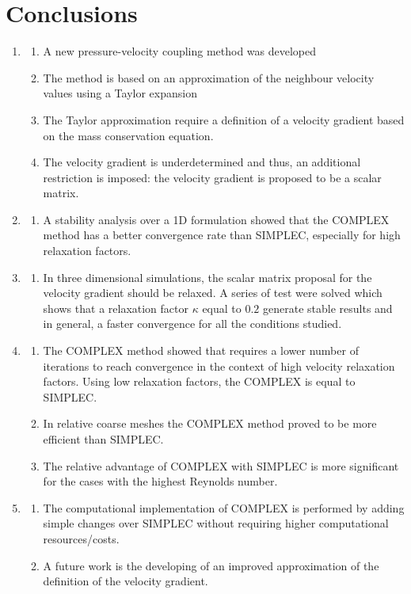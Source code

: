 \documentclass[final,3p,times,10pt,onecolumn]{myElsarticle}
\numberwithin{equation}{section}
\begin{document}
\section{Conclusions}
\label{sec:conclusions}

\begin{enumerate}

\item \begin{enumerate}
\item A new pressure-velocity coupling method was developed
\item The method is based on an approximation of the neighbour velocity values using a Taylor expansion
\item The Taylor approximation require a definition of a velocity gradient based on the mass conservation equation.
\item The velocity gradient is underdetermined and thus, an additional restriction is imposed: the velocity gradient is proposed to be a scalar matrix.
\end{enumerate} 
\item \begin{enumerate}
\item A stability analysis over a 1D formulation showed that the COMPLEX method has a better convergence rate than SIMPLEC, especially for high relaxation factors.
\end{enumerate}
\item \begin{enumerate}
\item In three dimensional simulations, the scalar matrix proposal for the velocity gradient should be relaxed. A series of test were solved which shows that a relaxation factor $\kappa$ equal to $0.2$ generate stable results and in general,  a faster convergence for all the conditions studied.
\end{enumerate}
\item  
\begin{enumerate}
\item The COMPLEX method showed that requires a lower number of iterations to reach convergence in the context of high velocity relaxation factors. Using low relaxation factors, the COMPLEX is equal to SIMPLEC.
\item In relative coarse meshes the COMPLEX method proved to be more efficient than SIMPLEC.
\item The relative advantage of COMPLEX with SIMPLEC is more significant for the cases with the highest Reynolds number.
\end{enumerate}
\item 
\begin{enumerate}
\item The computational implementation of COMPLEX is performed by adding simple changes over SIMPLEC without requiring  higher computational resources/costs.
\item A future work is the developing of an improved approximation of the definition of the velocity gradient. 
\end{enumerate}
\end{enumerate}



\end{document}
